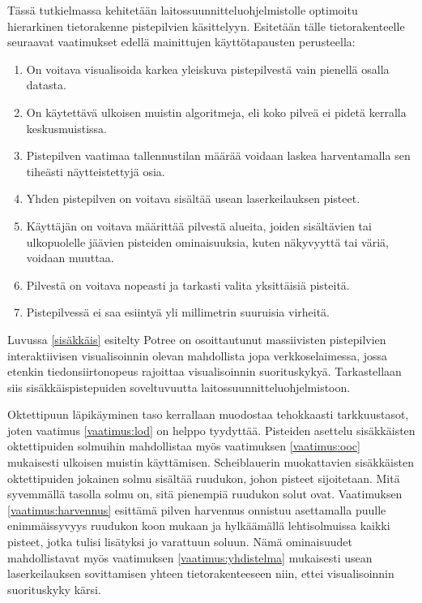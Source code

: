 Tässä tutkielmassa kehitetään laitossuunnitteluohjelmistolle optimoitu hierarkinen tietorakenne pistepilvien käsittelyyn. Esitetään tälle tietorakenteelle seuraavat vaatimukset edellä mainittujen käyttötapausten perusteella:
\begin{enumerate}
    \item \label{vaatimus:lod} On voitava visualisoida karkea yleiskuva pistepilvestä vain pienellä osalla datasta.
    \item \label{vaatimus:ooc} On käytettävä ulkoisen muistin algoritmeja, eli koko pilveä ei pidetä kerralla keskusmuistissa.
    \item \label{vaatimus:harvennus} Pistepilven vaatimaa tallennustilan määrää voidaan laskea harventamalla sen tiheästi näytteistettyjä osia. 
    \item \label{vaatimus:yhdistelma} Yhden pistepilven on voitava sisältää usean laserkeilauksen pisteet. 
    \item \label{vaatimus:crop} Käyttäjän on voitava määrittää pilvestä alueita, joiden sisältävien tai ulkopuolelle jäävien pisteiden ominaisuuksia, kuten näkyvyyttä tai väriä, voidaan muuttaa.
    \item \label{vaatimus:select} Pilvestä on voitava nopeasti ja tarkasti valita yksittäisiä pisteitä.
    \item \label{vaatimus:virhe} Pistepilvessä ei saa esiintyä yli millimetrin suuruisia virheitä.
\end{enumerate}

Luvussa \ref{sisäkkäis} esitelty Potree on osoittautunut massiivisten pistepilvien interaktiivisen visualisoinnin olevan mahdollista jopa verkkoselaimessa, jossa etenkin tiedonsiirtonopeus rajoittaa visualisoinnin suorituskykyä. Tarkastellaan siis sisäkkäispistepuiden soveltuvuutta laitossuunnitteluohjelmistoon. 

Oktettipuun läpikäyminen taso kerrallaan muodostaa tehokkaasti tarkkuustasot, joten vaatimus \ref{vaatimus:lod} on helppo tyydyttää. Pisteiden asettelu sisäkkäisten oktettipuiden solmuihin mahdollistaa myös vaatimuksen \ref{vaatimus:ooc} mukaisesti ulkoisen muistin käyttämisen. Scheiblauerin muokattavien sisäkkäisten oktettipuiden jokainen solmu sisältää ruudukon, johon pisteet sijoitetaan. Mitä syvemmällä tasolla solmu on, sitä pienempiä ruudukon solut ovat. Vaatimuksen \ref{vaatimus:harvennus} esittämä pilven harvennus onnistuu asettamalla puulle enimmäissyvyys ruudukon koon mukaan ja hylkäämällä lehtisolmuissa kaikki pisteet, jotka tulisi lisätyksi jo varattuun soluun. Nämä ominaisuudet mahdollistavat myös vaatimuksen \ref{vaatimus:yhdistelma} mukaisesti usean laserkeilauksen sovittamisen yhteen tietorakenteeseen niin, ettei visualisoinnin suorituskyky kärsi. 

